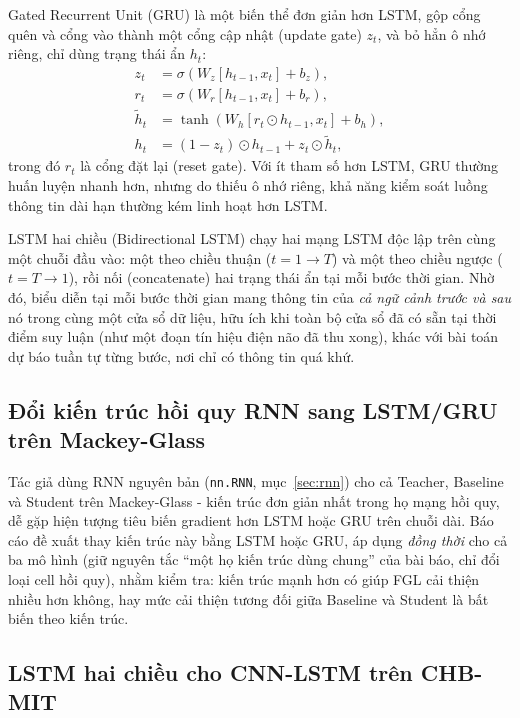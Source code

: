 Gated Recurrent Unit (GRU) \cite{cho2014gru} là một biến thể đơn giản hơn LSTM, gộp cổng quên
và cổng vào thành một cổng cập nhật (update gate) $z_t$, và bỏ hẳn ô nhớ riêng, chỉ dùng trạng
thái ẩn $h_t$:
\begin{align}
	z_t &= \sigma\!\left(W_z [h_{t-1}, x_t] + b_z\right), \\
	r_t &= \sigma\!\left(W_r [h_{t-1}, x_t] + b_r\right), \\
	\tilde{h}_t &= \tanh\!\left(W_h [r_t \odot h_{t-1}, x_t] + b_h\right), \\
	h_t &= (1 - z_t) \odot h_{t-1} + z_t \odot \tilde{h}_t,
	\label{eq:gru}
\end{align}
trong đó $r_t$ là cổng đặt lại (reset gate). Với ít tham số hơn LSTM, GRU thường huấn luyện
nhanh hơn, nhưng do thiếu ô nhớ riêng, khả năng kiểm soát luồng thông tin dài hạn thường kém
linh hoạt hơn LSTM.

LSTM hai chiều (Bidirectional LSTM) chạy hai mạng LSTM độc lập trên cùng một chuỗi đầu vào:
một theo chiều thuận ($t=1 \to T$) và một theo chiều ngược ($t=T \to 1$), rồi nối
(concatenate) hai trạng thái ẩn tại mỗi bước thời gian. Nhờ đó, biểu diễn tại mỗi bước thời
gian mang thông tin của \textit{cả ngữ cảnh trước và sau} nó trong cùng một cửa sổ dữ liệu,
hữu ích khi toàn bộ cửa sổ đã có sẵn tại thời điểm suy luận (như một đoạn tín hiệu điện não đã
thu xong), khác với bài toán dự báo tuần tự từng bước, nơi chỉ có thông tin quá khứ.

\subsection{Đổi kiến trúc hồi quy RNN sang LSTM/GRU trên Mackey-Glass}

Tác giả dùng RNN nguyên bản (\texttt{nn.RNN}, mục~\ref{sec:rnn}) cho cả Teacher, Baseline và
Student trên Mackey-Glass - kiến trúc đơn giản nhất trong họ mạng hồi quy, dễ gặp hiện tượng
tiêu biến gradient hơn LSTM hoặc GRU trên chuỗi dài. Báo cáo đề xuất thay kiến trúc này bằng
LSTM hoặc GRU, áp dụng \textit{đồng thời} cho cả ba mô hình (giữ nguyên tắc ``một họ kiến trúc
dùng chung'' của bài báo, chỉ đổi loại cell hồi quy), nhằm kiểm tra: kiến trúc mạnh hơn có giúp
FGL cải thiện nhiều hơn không, hay mức cải thiện tương đối giữa Baseline và Student là bất biến
theo kiến trúc.

\subsection{LSTM hai chiều cho CNN-LSTM trên CHB-MIT}

